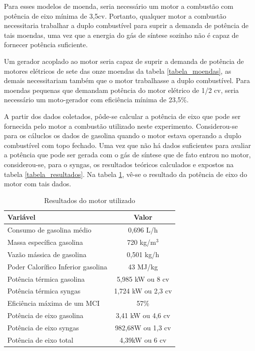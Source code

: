 Para esses modelos de moenda, seria necessário um motor a combustão com potência de eixo mínima de 3,5cv. Portanto, qualquer motor a combustão necessitaria trabalhar a duplo combustível para suprir a demanda de potência de tais moendas, uma vez que a energia do gás de síntese sozinho não é capaz de fornecer potência suficiente.

Um gerador acoplado ao motor seria capaz de suprir a demanda de potência de motores elétricos de sete das onze moendas da tabela \ref{tabela_moendas}, as demais necessitariam também que o motor trabalhasse a duplo combustível. Para moendas pequenas que demandam potência do motor elétrico de 1/2 cv, seria necessário um moto-gerador com eficiência mínima de 23,5\%.

A partir dos dados coletados, pôde-se calcular a potência de eixo que pode ser fornecida pelo motor a combustão utilizado neste experimento. Considerou-se para os cáluclos os dados de gasolina quando o motor estava operando a duplo combustível com topo fechado. Uma vez que não há dados suficientes para avaliar a potência que pode ser gerada com o gás de síntese que de fato entrou no motor, considerou-se, para o syngas, os resultados teóricos calculados e expostos na tabela \ref{tabela_resultados}. Na tabela \ref{tabela_potencia_motor_fiat}, vê-se o resultado da potência de eixo do motor com tais dados.

\begin{table}[h]
	\centering
	\caption{Resultados do motor utilizado}
	\begin{tabular}{|l|c|}
		\hline
		\rowcolor{lightgray} Variável & Valor \\
		\hline
		Consumo de gasolina médio & 0,696 L/h \\
		Massa específica gasolina & 720 kg/m$^3$ \\
		Vazão mássica de gasolina & 0,501 kg/h \\
		Poder Calorífico Inferior gasolina & 43 MJ/kg \\
		Potência térmica gasolina & 5,985 kW ou 8 cv\\
		Potência térmica syngas & 1,724 kW ou 2,3 cv \\
		Eficiência máxima de um MCI & 57\% \\
		 Potência de eixo gasolina & 3,41 kW ou 4,6 cv \\
		 Potência de eixo syngas & 982,68W ou 1,3 cv \\
		 Potência de eixo total & 4,39kW ou 6 cv \\
		\hline
	\end{tabular}
	\label{tabela_potencia_motor_fiat}
\end{table}	


